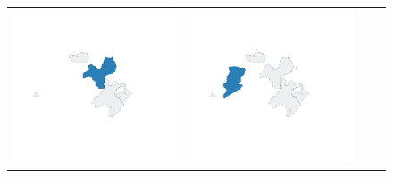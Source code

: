 \begin{figure}
\begin{tabularx}{1\textwidth}{XXXX}
\includegraphics[width=1\linewidth]{images/ch6/loading/03}&
\includegraphics[width=1\linewidth]{images/ch6/loading/04} \\

\end{tabularx}
\end{figure}
